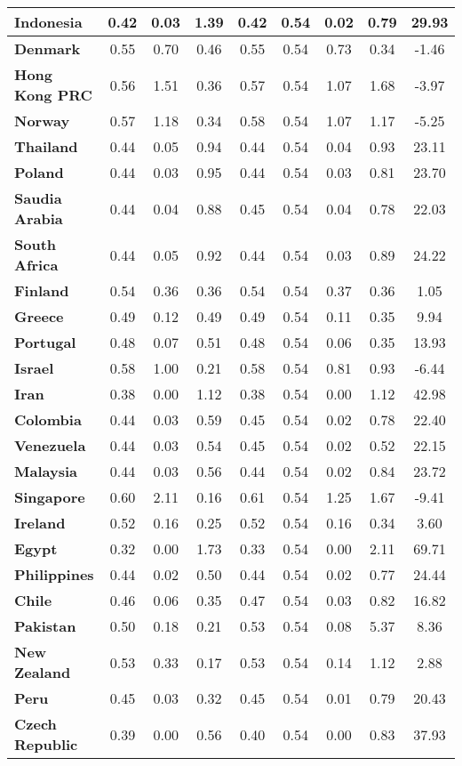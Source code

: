 \begin{small}
\begin{tabular}{|l|c|c|c|c|c|c|c|c|}
\textbf{Indonesia}&0.42&0.03&1.39&0.42&0.54&0.02&0.79&29.93\\\hline
\textbf{Denmark}&0.55&0.70&0.46&0.55&0.54&0.73&0.34&-1.46\\\hline
\textbf{Hong Kong PRC}&0.56&1.51&0.36&0.57&0.54&1.07&1.68&-3.97\\\hline
\textbf{Norway}&0.57&1.18&0.34&0.58&0.54&1.07&1.17&-5.25\\\hline
\textbf{Thailand}&0.44&0.05&0.94&0.44&0.54&0.04&0.93&23.11\\\hline
\textbf{Poland}&0.44&0.03&0.95&0.44&0.54&0.03&0.81&23.70\\\hline
\textbf{Saudia Arabia}&0.44&0.04&0.88&0.45&0.54&0.04&0.78&22.03\\\hline
\textbf{South Africa}&0.44&0.05&0.92&0.44&0.54&0.03&0.89&24.22\\\hline
\textbf{Finland}&0.54&0.36&0.36&0.54&0.54&0.37&0.36&1.05\\\hline
\textbf{Greece}&0.49&0.12&0.49&0.49&0.54&0.11&0.35&9.94\\\hline
\textbf{Portugal}&0.48&0.07&0.51&0.48&0.54&0.06&0.35&13.93\\\hline
\textbf{Israel}&0.58&1.00&0.21&0.58&0.54&0.81&0.93&-6.44\\\hline
\textbf{Iran}&0.38&0.00&1.12&0.38&0.54&0.00&1.12&42.98\\\hline
\textbf{Colombia}&0.44&0.03&0.59&0.45&0.54&0.02&0.78&22.40\\\hline
\textbf{Venezuela}&0.44&0.03&0.54&0.45&0.54&0.02&0.52&22.15\\\hline
\textbf{Malaysia}&0.44&0.03&0.56&0.44&0.54&0.02&0.84&23.72\\\hline
\textbf{Singapore}&0.60&2.11&0.16&0.61&0.54&1.25&1.67&-9.41\\\hline
\textbf{Ireland}&0.52&0.16&0.25&0.52&0.54&0.16&0.34&3.60\\\hline
\textbf{Egypt}&0.32&0.00&1.73&0.33&0.54&0.00&2.11&69.71\\\hline
\textbf{Philippines}&0.44&0.02&0.50&0.44&0.54&0.02&0.77&24.44\\\hline
\textbf{Chile}&0.46&0.06&0.35&0.47&0.54&0.03&0.82&16.82\\\hline
\textbf{Pakistan}&0.50&0.18&0.21&0.53&0.54&0.08&5.37&8.36\\\hline
\textbf{New Zealand}&0.53&0.33&0.17&0.53&0.54&0.14&1.12&2.88\\\hline
\textbf{Peru}&0.45&0.03&0.32&0.45&0.54&0.01&0.79&20.43\\\hline
\textbf{Czech Republic}&0.39&0.00&0.56&0.40&0.54&0.00&0.83&37.93\\\hline

\end{tabular}
\end{small}
